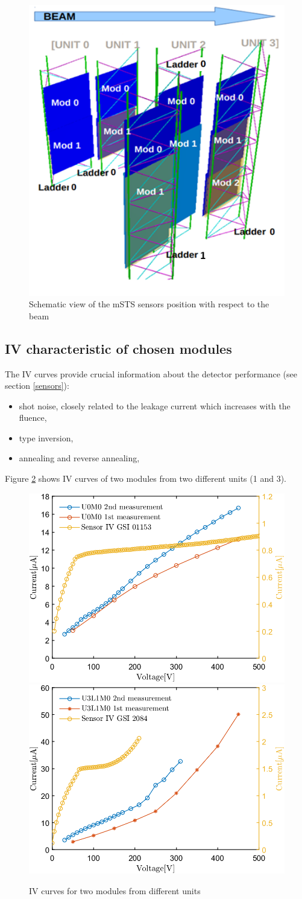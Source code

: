 \begin{figure}[!h]
\centering
\includegraphics[width=0.4\columnwidth]{Chapter6/DCS/images/msts_sensors_scheme.png}
\caption{Schematic view of the \gls{mSTS} sensors position with respect to the beam}
\label{fig_sensors_scheme}
\end{figure}
\newpage
\subsection{IV characteristic of chosen modules}
The IV curves provide crucial information about the detector performance (see section \ref{sensors}):
\begin{itemize}
    \item shot noise, closely related to the leakage current which increases with the fluence,
    \item type inversion,
    \item annealing and reverse annealing,
\end{itemize}
Figure \ref{fig_IV} shows IV curves of two modules from two different units (1 and 3). 
\begin{figure}[!h]
\centering
\includegraphics[width=0.45\columnwidth]{Chapter6/DCS/images/IV/U0FEB1.png}
\includegraphics[width=0.45\columnwidth]{Chapter6/DCS/images/IV/U3L1FEB1.png}
\caption{IV curves for two modules from different units}
\label{fig_IV}
\end{figure}

